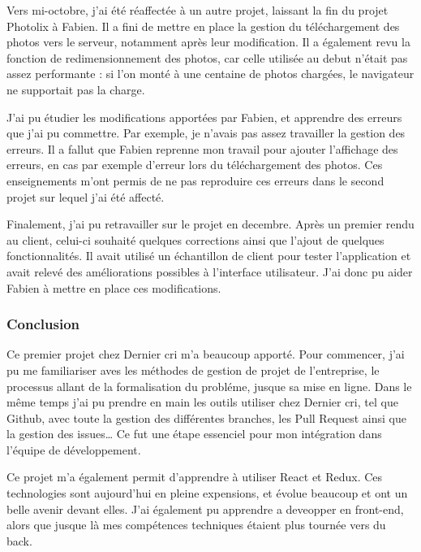 \bigskip

Vers mi-octobre, j'ai été réaffectée à un autre projet, laissant la fin
du projet Photolix à Fabien. Il a fini de mettre en place la gestion du
téléchargement des photos vers le serveur, notamment après leur
modification. Il a également revu la fonction de redimensionnement des
photos, car celle utilisée au debut n'était pas assez performante : si
l'on monté à une centaine de photos chargées, le navigateur ne
supportait pas la charge.

\bigskip

J'ai pu étudier les modifications apportées par Fabien, et apprendre des
erreurs que j'ai pu commettre. Par exemple, je n'avais pas assez
travailler la gestion des erreurs. Il a fallut que Fabien reprenne mon
travail pour ajouter l'affichage des erreurs, en cas par exemple
d'erreur lors du téléchargement des photos. Ces enseignements m'ont
permis de ne pas reproduire ces erreurs dans le second projet sur lequel
j'ai été affecté.

\bigskip

Finalement, j'ai pu retravailler sur le projet en decembre. Après un
premier rendu au client, celui-ci souhaité quelques corrections ainsi
que l'ajout de quelques fonctionnalités. Il avait utilisé un échantillon
de client pour tester l'application et avait relevé des améliorations
possibles à l'interface utilisateur. J'ai donc pu aider Fabien à mettre
en place ces modifications.

\bigskip

\subsubsection{Conclusion}\label{conclusion}

\bigskip

Ce premier projet chez Dernier cri m'a beaucoup apporté. Pour commencer,
j'ai pu me familiariser aves les méthodes de gestion de projet de
l'entreprise, le processus allant de la formalisation du probléme,
jusque sa mise en ligne. Dans le même temps j'ai pu prendre en main les
outils utiliser chez Dernier cri, tel que Github, avec toute la gestion
des différentes branches, les Pull Request ainsi que la gestion des
issues\ldots{} Ce fut une étape essenciel pour mon intégration dans
l'équipe de développement.

\bigskip

Ce projet m'a également permit d'apprendre à utiliser React et Redux.
Ces technologies sont aujourd'hui en pleine expensions, et évolue
beaucoup et ont un belle avenir devant elles. J'ai également pu
apprendre a deveopper en front-end, alors que jusque là mes compétences
techniques étaient plus tournée vers du back.

